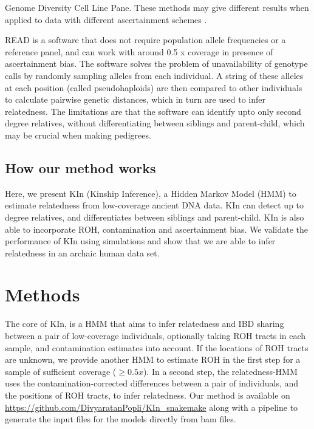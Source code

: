 \documentclass[12pt, letterpaper]{article}
\begin{document}
Genome Diversity Cell Line Pane. These methods may give different results when applied to data with different ascertainment schemes \cite{waples_allele_2019}. 

READ is a software that does not require population allele frequencies or a reference panel, and can work with around 0.5 x coverage in presence of ascertainment bias. The software solves the problem of unavailability of genotype calls by randomly sampling alleles from each individual. A string of these alleles at each position (called pseudohaploids) are then compared to other individuals to calculate pairwise genetic distances, which in turn are used to infer relatedness. The limitations are that the software can identify upto only second degree relatives, without differentiating between siblings and parent-child, which may be crucial when making pedigrees. 

\subsection{How our method works}
Here, we present KIn (Kinship Inference), a Hidden Markov Model (HMM) to estimate relatedness from low-coverage ancient DNA data. KIn can detect up to  degree relatives, and differentiates between siblings and parent-child. KIn is also able to incorporate ROH, contamination and ascertainment bias. We validate the performance of KIn using simulations and show that we are able to infer relatedness in an archaic human data set.



\section{Methods}


The core of  KIn, is a HMM that aims to infer relatedness and IBD sharing between a pair of low-coverage individuals, optionally taking ROH tracts in each sample, and contamination estimates into account. If the locations of ROH tracts are unknown, we provide another HMM to estimate ROH in the first step for a sample of sufficient coverage ($\geq 0.5x$). In a second step, the relatedness-HMM uses the contamination-corrected differences between a pair of individuals, and the positions of ROH tracts, to infer relatedness.  Our method is available on \url{https://github.com/DivyaratanPopli/KIn_snakemake} along with a  \cite{koster_snakemakescalable_2012} pipeline to generate the input files for the models directly from bam files. 
\end{document}
